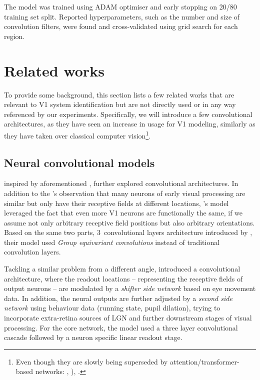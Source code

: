 The model was trained using ADAM optimiser and early stopping on 20/80 training set split. Reported hyperparameters, such as the number and size of convolution filters, were found and cross-validated using grid search for each region.

\section{Related works}\label{ch:2.3}
To provide some background, this section lists a few related works that are relevant to V1 system identification but are not directly used or in any way referenced by our experiments. Specifically, we will introduce a few convolutional architectures, as they have seen an increase in usage for V1 modeling, similarly as they have taken over classical computer vision\footnote{Even though they are slowly being superseded by attention/transformer-based networks: \citep{2019arXiv190605909R}, \citep{2019arXiv190409925B}), \citep{dosovitskiy2020image}.}.

\subsection{Neural convolutional models}
\cite{ecker} inspired by aforementioned \cite{klindt}, further explored convolutional architectures. In addition to the \citeauthor{klindt}’s observation that many neurons of early visual processing are similar but only have their receptive fields at different locations, \citeauthor{ecker}’s model leveraged the fact that even more V1 neurons are functionally the same, if we assume not only arbitrary receptive field positions but also arbitrary orientations. Based on the same two parts, 3~convolutional layers architecture introduced by \citeauthor{klindt}, their model used \textit{Group equivariant convolutions} \citep{2016arXiv160207576C} instead of traditional convolution layers.

Tackling a similar problem from a different angle, \cite{Walke506956} introduced a convolutional architecture, where the readout locations -- representing the receptive fields of output neurons -- are modulated by a \textit{shifter side network} based on eye movement data. In addition, the neural outputs are further adjusted by a \textit{second side network} using behaviour data (running state, pupil dilation), trying to incorporate extra-retina sources of LGN and further downstream stages of visual processing. For the core network, the model used a three layer convolutional cascade followed by a neuron specific linear readout stage. 

